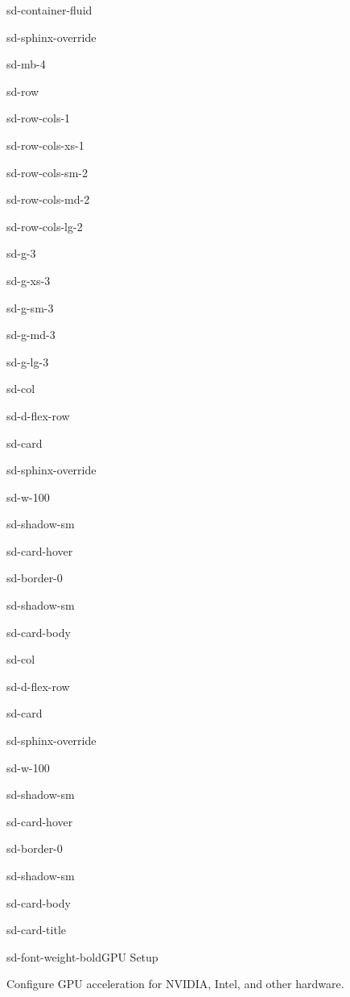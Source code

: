 \documentclass[a4paper,10pt,english]{sphinxmanual}
\begin{document}
\begin{sphinxuseclass}{sd-container-fluid}
\begin{sphinxuseclass}{sd-sphinx-override}
\begin{sphinxuseclass}{sd-mb-4}
\begin{sphinxuseclass}{sd-row}
\begin{sphinxuseclass}{sd-row-cols-1}
\begin{sphinxuseclass}{sd-row-cols-xs-1}
\begin{sphinxuseclass}{sd-row-cols-sm-2}
\begin{sphinxuseclass}{sd-row-cols-md-2}
\begin{sphinxuseclass}{sd-row-cols-lg-2}
\begin{sphinxuseclass}{sd-g-3}
\begin{sphinxuseclass}{sd-g-xs-3}
\begin{sphinxuseclass}{sd-g-sm-3}
\begin{sphinxuseclass}{sd-g-md-3}
\begin{sphinxuseclass}{sd-g-lg-3}
\begin{sphinxuseclass}{sd-col}
\begin{sphinxuseclass}{sd-d-flex-row}
\begin{sphinxuseclass}{sd-card}
\begin{sphinxuseclass}{sd-sphinx-override}
\begin{sphinxuseclass}{sd-w-100}
\begin{sphinxuseclass}{sd-shadow-sm}
\begin{sphinxuseclass}{sd-card-hover}
\begin{sphinxuseclass}{sd-border-0}
\begin{sphinxuseclass}{sd-shadow-sm}
\begin{sphinxuseclass}{sd-card-body}
\end{sphinxuseclass}{\hyperref[\detokenize{getting-started/docker::doc}]{}}
\end{sphinxuseclass}
\end{sphinxuseclass}
\end{sphinxuseclass}
\end{sphinxuseclass}
\end{sphinxuseclass}
\end{sphinxuseclass}
\end{sphinxuseclass}
\end{sphinxuseclass}
\end{sphinxuseclass}
\begin{sphinxuseclass}{sd-col}
\begin{sphinxuseclass}{sd-d-flex-row}
\begin{sphinxuseclass}{sd-card}
\begin{sphinxuseclass}{sd-sphinx-override}
\begin{sphinxuseclass}{sd-w-100}
\begin{sphinxuseclass}{sd-shadow-sm}
\begin{sphinxuseclass}{sd-card-hover}
\begin{sphinxuseclass}{sd-border-0}
\begin{sphinxuseclass}{sd-shadow-sm}
\begin{sphinxuseclass}{sd-card-body}
\begin{sphinxuseclass}{sd-card-title}
\begin{sphinxuseclass}{sd-font-weight-bold}GPU Setup
\end{sphinxuseclass}
\end{sphinxuseclass}
\sphinxAtStartPar
Configure GPU acceleration for NVIDIA, Intel, and other hardware.


\end{sphinxuseclass}
\end{sphinxuseclass}
\end{sphinxuseclass}
\end{sphinxuseclass}
\end{sphinxuseclass}
\end{sphinxuseclass}
\end{sphinxuseclass}
\end{sphinxuseclass}
\end{sphinxuseclass}
\end{sphinxuseclass}
\end{sphinxuseclass}
\end{sphinxuseclass}
\end{sphinxuseclass}
\end{sphinxuseclass}
\end{sphinxuseclass}
\end{sphinxuseclass}
\end{sphinxuseclass}
\end{sphinxuseclass}
\end{sphinxuseclass}
\end{sphinxuseclass}
\end{sphinxuseclass}
\end{sphinxuseclass}
\end{sphinxuseclass}
\end{sphinxuseclass}
\end{document}
